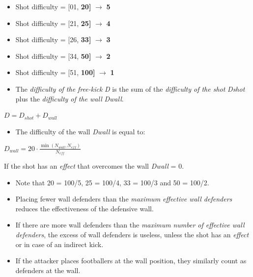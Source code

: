 \documentclass[12pt]{article}
\begin{document}
\begin{rulebox}
\begin{itemize}
\item Shot difficulty = [01,  \textbf{20]} $\rightarrow$ \textbf{5}
\item Shot difficulty = [21,  \textbf{25]} $\rightarrow$ \textbf{4}
\item Shot difficulty = [26,  \textbf{33] }$\rightarrow$ \textbf{3}
\item Shot difficulty = [34,  \textbf{50]} $\rightarrow$ \textbf{2}
\item Shot difficulty = [51, \textbf{100]} $\rightarrow$ \textbf{1}
\item The \emph{difficulty of the free-kick} \emph{D} is the sum of the \emph{difficulty of the shot} \emph{D}\emph{shot} plus the \emph{difficulty of the wall} \emph{D}\emph{wall}.
\end{itemize}

\begin{formulabox}
$D = D_{shot} + D_{wall}$
\end{formulabox}

\begin{itemize}
\item The difficulty of the wall \emph{D}\emph{wall} is equal to:
\end{itemize}

\begin{formulabox}
$D_{wall} = 20 \cdot \frac{\min(N_{wall}, N_{eff})}{N_{eff}}$
\end{formulabox}
\end{rulebox}

\begin{specialcase}
If the shot has an \emph{effect }that overcomes the wall \emph{D}\emph{wall }= 0.
\end{specialcase}

\begin{note}
\begin{itemize}
\item Note that 20 = 100/5, 25 = 100/4, 33 = 100/3 and 50 = 100/2.
\item Placing fewer wall defenders than the \emph{maximum effective wall defenders} reduces the effectiveness of the defensive wall.
\item If there are more wall defenders than the \emph{maximum} \emph{number of effective wall defenders}, the excess of wall defenders is useless, unless the shot has an \emph{effect} or in case of an indirect kick.
\item If the attacker places footballers at the wall position, they similarly count as defenders at the wall.
\end{itemize}
\end{note}
\end{document}
